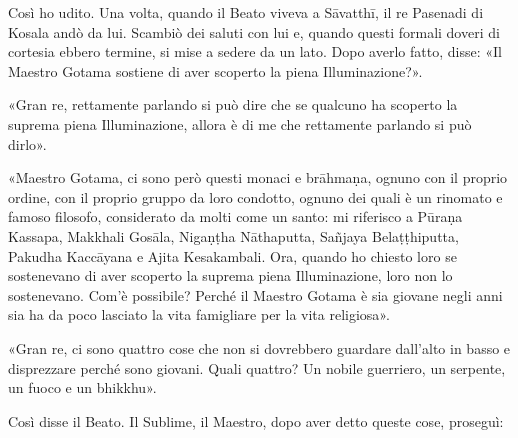  Così ho udito. Una volta, quando il Beato viveva a Sāvatthī,
il re Pasenadi di Kosala andò da lui. Scambiò dei saluti con lui e,
quando questi formali doveri di cortesia ebbero termine, si mise a
sedere da un lato. Dopo averlo fatto, disse: «Il Maestro Gotama sostiene
di aver scoperto la piena Illuminazione?».


«Gran re, rettamente parlando si può dire che se qualcuno ha scoperto la
suprema piena Illuminazione, allora è di me che rettamente parlando si
può dirlo».


«Maestro Gotama, ci sono però questi monaci e brāhmaṇa, ognuno con il
proprio ordine, con il proprio gruppo da loro condotto, ognuno dei quali
è un rinomato e famoso filosofo, considerato da molti come un santo: mi
riferisco a Pūraṇa Kassapa, Makkhali Gosāla, Nigaṇṭha Nāthaputta,
Sañjaya Belaṭṭhiputta, Pakudha Kaccāyana e Ajita Kesakambali. Ora,
quando ho chiesto loro se sostenevano di aver scoperto la suprema piena
Illuminazione, loro non lo sostenevano. Com’è possibile? Perché il
Maestro Gotama è sia giovane negli anni sia ha da poco lasciato la vita
famigliare per la vita religiosa».


«Gran re, ci sono quattro cose che non si dovrebbero guardare dall’alto
in basso e disprezzare perché sono giovani. Quali quattro? Un nobile
guerriero, un serpente, un fuoco e un bhikkhu».


Così disse il Beato. Il Sublime, il Maestro, dopo aver detto queste
cose, proseguì:


